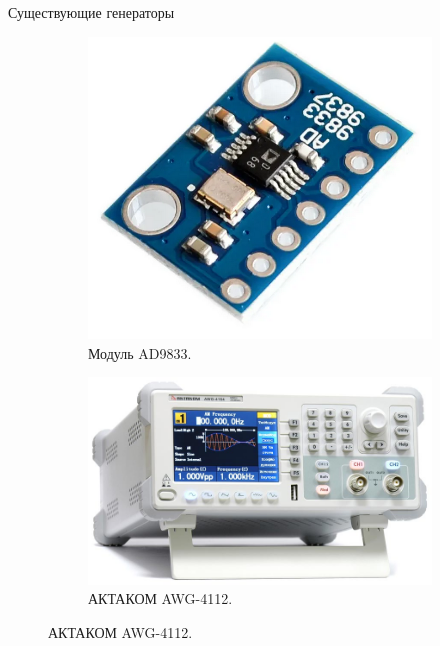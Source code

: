 \documentclass[10pt]{beamer}
\begin{document}
\begin{frame}{Существующие генераторы}
\begin{figure}
     \begin{subfigure}[H]{0.35\textwidth}
         \centering
         \includegraphics[width=\textwidth]{ad9833}
         \caption*{Модуль AD9833.}
     \end{subfigure}
     \hfill
     \begin{subfigure}[H]{0.5\textwidth}
         \centering
         \includegraphics[width=\textwidth]{AWG-4112}
         \caption*{АКТАКОМ AWG-4112.}
     \end{subfigure}
\end{figure}
\begin{columns}
\begin{column}{0.5\textwidth}
\vspace{0.3cm}


\end{column}
\end{columns}
\end{frame}
\end{document}
